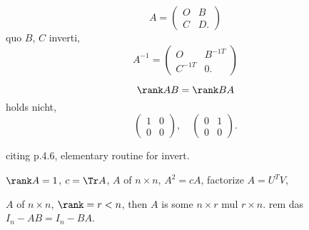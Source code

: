 \documentclass{ctexart}
\begin{document}
\begin{ex}
	\[ A=\begin{pmatrix}
		O & B\\
		C & D.
	\end{pmatrix} \]
	quo $B$, $C$ inverti,
	\[ A^{-1}  = \begin{pmatrix}
		O & B^{-1T}\\
		C^{-1T} & 0.
	\end{pmatrix} \]
\end{ex}
\begin{ex}
	\[ \rank AB = \rank BA \]
	holds nicht,
	\[ \begin{pmatrix}
		1 & 0\\ 0 & 0
	\end{pmatrix},\quad \begin{pmatrix}
		0 & 1\\
		0 & 0
	\end{pmatrix}. \]
\end{ex}
\begin{ex}
	citing p.4.6, elementary routine for invert.
\end{ex}
\begin{ex}
	$\rank A = 1$, $c = \Tr A$, $A$ of $n\times n$, $A^2 = cA$, factorize $A=U^TV$, 
\end{ex}
\begin{finale}
	$A$ of $n\times n$, $\rank =r<n$, then $A$ is some $n\times r$ mul $r\times n$.
	rem das $I_n - AB = I_n - BA$.
\end{finale}
\end{document}
